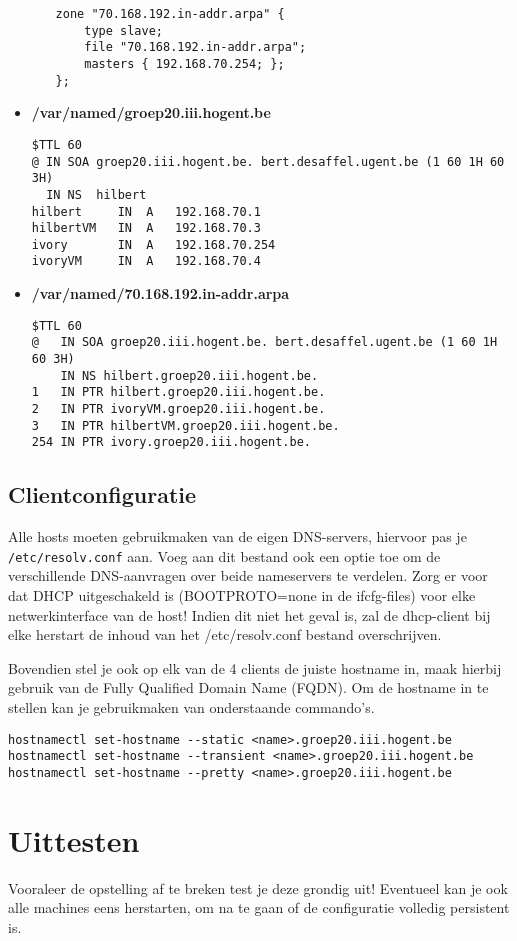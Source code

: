 \documentclass{report}
\begin{document}
\begin{itemize}
\begin{itemize}
\begin{lstlisting}
zone "70.168.192.in-addr.arpa" {
	type slave;
	file "70.168.192.in-addr.arpa";
	masters { 192.168.70.254; };
};
		\end{lstlisting}
	\end{itemize}
	\item \textbf{/var/named/groep20.iii.hogent.be}
	\begin{lstlisting}
$TTL 60
@ IN SOA groep20.iii.hogent.be. bert.desaffel.ugent.be (1 60 1H 60 3H)
  IN NS	 hilbert
hilbert 	IN	A	192.168.70.1
hilbertVM 	IN	A	192.168.70.3
ivory 		IN	A	192.168.70.254
ivoryVM	 	IN	A	192.168.70.4
	\end{lstlisting}
	\item \textbf{/var/named/70.168.192.in-addr.arpa}
	\begin{lstlisting}
$TTL 60
@   IN SOA groep20.iii.hogent.be. bert.desaffel.ugent.be (1 60 1H 60 3H)
    IN NS hilbert.groep20.iii.hogent.be.	
1   IN PTR hilbert.groep20.iii.hogent.be.
2   IN PTR ivoryVM.groep20.iii.hogent.be.
3   IN PTR hilbertVM.groep20.iii.hogent.be.
254 IN PTR ivory.groep20.iii.hogent.be.
	\end{lstlisting}	
\end{itemize}

\subsection{Clientconfiguratie}
Alle hosts moeten gebruikmaken van de eigen DNS-servers, hiervoor pas je \texttt{/etc/resolv.conf} aan. Voeg aan dit bestand ook een optie toe om de verschillende DNS-aanvragen over beide nameservers te verdelen.
Zorg er voor dat DHCP uitgeschakeld is (BOOTPROTO=none in de ifcfg-files) voor elke netwerkinterface van de host! Indien dit niet het geval is, zal de dhcp-client bij elke herstart de inhoud van het /etc/resolv.conf bestand overschrijven.

Bovendien stel je ook op elk van de 4 clients de juiste hostname in, maak hierbij gebruik van de Fully Qualified Domain Name (FQDN). Om de hostname in te stellen kan je gebruikmaken van onderstaande commando's. 
\begin{lstlisting}
hostnamectl set-hostname --static <name>.groep20.iii.hogent.be
hostnamectl set-hostname --transient <name>.groep20.iii.hogent.be
hostnamectl set-hostname --pretty <name>.groep20.iii.hogent.be
\end{lstlisting}
\section{Uittesten}
 Vooraleer de opstelling af te breken test je deze grondig uit! Eventueel kan je ook alle machines eens herstarten, om na te gaan of de configuratie volledig persistent is.
	
\end{document}
